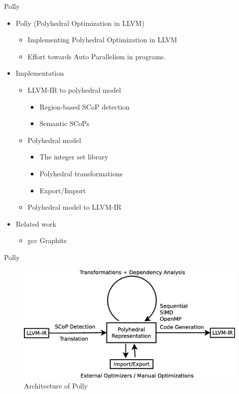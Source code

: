 \documentclass{beamer}
\begin{document}
\begin{frame}{Polly}
\begin{itemize}
\item Polly (Polyhedral Optimization in LLVM)
	\begin{itemize}
	\item Implementing Polyhedral Optimization in LLVM
	\item Effort towards Auto Parallelism in programs.
	\end{itemize}
\item Implementation
	\begin{itemize}
	\item LLVM-IR to polyhedral model
			\begin{itemize}
			\item Region-based SCoP detection
			\item Semantic SCoPs
			\end{itemize}
	\item Polyhedral model
		\begin{itemize}
		\item The integer set library
		\item Polyhedral transformations
		\item Export/Import
		\end{itemize}
	\item Polyhedral model to LLVM-IR
	\end{itemize}
\item Related work
	\begin{itemize}
	\item gcc Graphite
	\end{itemize}
\end{itemize}
\end{frame}

\begin{frame}{Polly}
\begin{figure}
  \includegraphics[width=1\textwidth]{images/architecture.eps}
  \caption{Architecture of Polly}
  \label{fig:arch}
\end{figure}
\end{frame}
\end{document}
